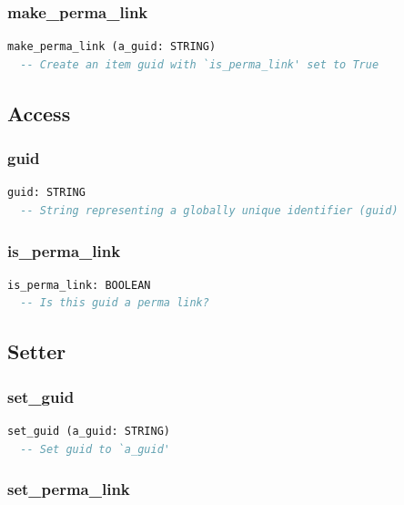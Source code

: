 \subsubsection{make\_perma\_link}

\begin{lstlisting}[language=Eiffel]
make_perma_link (a_guid: STRING)
  -- Create an item guid with `is_perma_link' set to True
\end{lstlisting}

\subsection{Access}
\label{sec:item-guid-access}

\subsubsection{guid}

\begin{lstlisting}[language=Eiffel]
guid: STRING
  -- String representing a globally unique identifier (guid)
\end{lstlisting}

\subsubsection{is\_perma\_link}

\begin{lstlisting}[language=Eiffel]
is_perma_link: BOOLEAN
  -- Is this guid a perma link?
\end{lstlisting}

\subsection{Setter}
\label{sec:item-guid-setter}

\subsubsection{set\_guid}

\begin{lstlisting}[language=Eiffel]
set_guid (a_guid: STRING)
  -- Set guid to `a_guid'
\end{lstlisting}

\subsubsection{set\_perma\_link}


